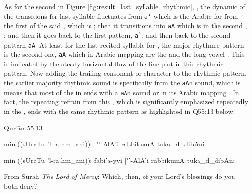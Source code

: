 As for the second   in Figure \ref{fig:result_last_syllable_rhythmic},  , the dynamic of the transitions for last syllable fluctuates from \texttt{a`} which is the Arabic for   from the first   of the said  , which is  ; then it transitions into \verb|aA| which is in the second  ,  ; and then it goes back to the first pattern, \verb|a`|; and then back to the second pattern \verb|aA|. At least for the last recited syllable for  , the major rhythmic pattern is the second one, \verb|aA| which in Arabic mapping are the   and the long vowel  . This is indicated by the steady horizontal flow of the line plot in this rhythmic pattern. Now adding the trailing consonant or character to the rhythmic pattern, the earlier majority rhythmic sound is specifically from the \verb|aAn| sound, which is means that most of the   in   ends with a \verb|aAn| sound or in its Arabic mapping  . In fact, the repeating refrain from this  , which is significantly emphasized repeatedly in the  , ends with the same rhythmic pattern as highlighted in Q55:13 below.

\begin{bottomtitledframe}{Qur'\=an 55:13}
    \begin{center}
        \begin{arab}
            min ((sUraTu 'l-ra.hm_ani)):  |"'-AlA'i rabbikumA tuka_d_dibAni
        \end{arab}
        \begin{arab}[trans]
            min ((sUraTu 'l-ra.hm_ani)): fabi'a-yyi |"'-AlA'i rabbikumA tuka_d_dibAni
        \end{arab}
    \end{center}
    From Surah \textit{The Lord of Mercy}: Which, then, of your Lord's blessings do you both deny?
\end{bottomtitledframe}

